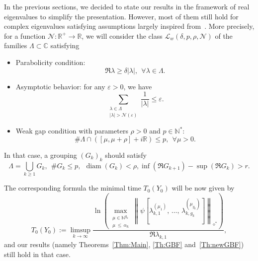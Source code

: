 \documentclass[10pt]{amsart}
\theoremstyle{definition}\newtheorem{defi}[theo]{Definition}\newtheorem{rema}[theo]{Remark}\newtheorem{exam}[theo]{Example}\newtheorem{exem}[theo]{Example}\newtheorem{nota}[theo]{Notation}
\newcommand{\Fzp}{Y_0}
\newcommand{\normeXalphas}[1]{\left\| #1 \right\|_{\diamond^*}}
\newcommand{\n}{g}
\newcommand{\LL}{\mathcal{L}}
\newcommand{\NN}{\mathcal{N}}
\newcommand{\N}{\mathbb{N}}
\newcommand{\R}{\mathbb{R}}
\newcommand{\C}{\mathbb{C}}
\DeclareMathOperator{\diam}{diam}
\let\oldforall\forall
\renewcommand*{\forall}{\mathrel{\oldforall}}
\begin{document}
In the previous sections, we decided to state our results in the framework of real eigenvalues to simplify the presentation. However, most of them still hold for complex eigenvalues satisfying assumptions largely inspired from~\cite{AmmarKhodjaBenabdallahGonzalez-BurgosdeTeresa:2014}. More precisely, for a function $\NN:\R^+\to \R$, we will consider the class $\LL_w(\delta,p,\rho,\NN)$ of the families $\Lambda\subset \C$ satisfying
\begin{itemize}
\item Parabolicity condition:
\[
\Re \lambda \geq \delta |\lambda|, \ \ \forall \lambda\in \Lambda.
\]
\item Asymptotic behavior: for any $\varepsilon>0$, we have
\[
\sum_{\substack{\lambda\in \Lambda\\ |\lambda|>\NN(\varepsilon)}} \frac{1}{|\lambda|} \leq \varepsilon.
\]
\item Weak gap condition with parameters $\rho>0$ and $p\in \N^*$:
\[
\# \Lambda \cap ([\mu,\mu+\rho]+i\R) \leq p, \ \ \forall \mu>0.
\]
\end{itemize}

In that case, a grouping $(G_k)_k$ should satisfy
\[
\Lambda=\bigcup_{k\geq 1} G_k, \ \ \# G_k\leq p, \ \ \diam(G_k)<\rho, \inf(\Re G_{k+1}) - \sup (\Re G_k) > r.
\]

The corresponding formula the minimal time $T_0(\Fzp)$ will be now given by
\[
T_0(\Fzp) := \limsup_{k\to \infty} \frac{\ln \left(\max\limits_{\substack{\mu\in \N^{\n_k}\\ \mu\,\leq\,\alpha_k}} \normeXalphas{\psi\left[\lambda_{k,1}^{(\mu_1)},\,\dotsc,\,\lambda_{k,\n_k}^{(\mu_{\n_k})}\right]}\right)}{\Re \lambda_{k,1}},
\]
and our results (namely Theorems~\ref{Thm:Main}, \ref{Th:GBF} and~\ref{Th:newGBF}) still hold in that case.
\end{document}
